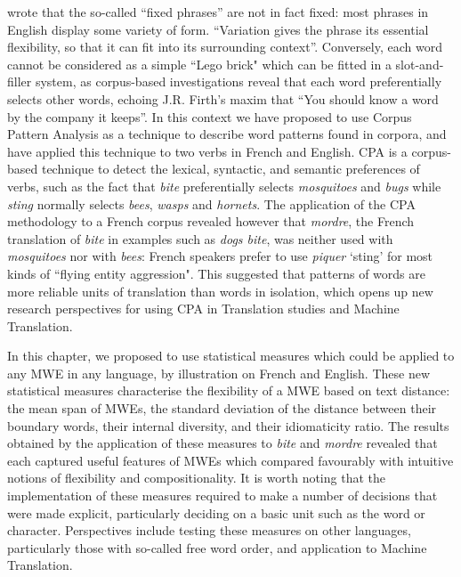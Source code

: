 \documentclass[output=paper]{langsci/langscibook}
\begin{document}
\citet{sinclair2004} wrote that the so-called “fixed phrases” are not in fact
fixed: most phrases in English display some variety of form. “Variation
gives the phrase its essential flexibility, so that it can fit into its
surrounding context”. Conversely, each word cannot be considered as a
simple ``Lego brick" which can be fitted in a slot-and-filler system, as
corpus-based investigations reveal that each word preferentially
selects other words, echoing J.R. Firth's maxim that “You should know a
word by the company it keeps”. In this context we have proposed to use
Corpus Pattern Analysis as a technique to describe word patterns found
in corpora, and have applied this technique to two verbs in French and
English. CPA is a corpus-based technique to detect the lexical,
syntactic, and semantic preferences of verbs, such as the fact that
\textit{bite} preferentially selects \textit{mosquitoes} and \textit{bugs} while \textit{sting}
normally selects \textit{bees}, \textit{wasps} and \textit{hornets}. The application of the
CPA methodology to a French corpus revealed however that \textit{mordre}, the
French translation of \textit{bite} in examples such as \textit{dogs bite}, was
neither used with \textit{mosquitoes} nor with \textit{bees}: French speakers prefer
to use \textit{piquer} ‘sting’ for most kinds of ``flying entity aggression".
This suggested that patterns of words are more reliable units of
translation than words in isolation, which opens up new research
perspectives for using CPA in Translation studies and Machine
Translation.



In this chapter, we proposed to use statistical measures which could be
applied to any MWE in any language, by illustration on French and
English. These new statistical measures characterise the flexibility of
a MWE based on text distance: the mean span of MWEs, the standard
deviation of the distance between their boundary words, their internal
diversity, and their idiomaticity ratio. The results obtained by the
application of these measures to \textit{bite} and \textit{mordre} revealed that each
captured useful features of MWEs which compared favourably with
intuitive notions of flexibility and compositionality. It is worth
noting that the implementation of these measures required to make a
number of decisions that were made explicit, particularly deciding on a
basic unit such as the word or character. Perspectives include testing
these measures on other languages, particularly those with so-called
free word order, and application to Machine Translation.
\end{document}
